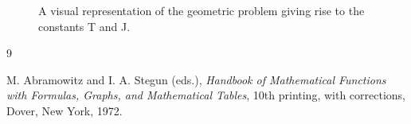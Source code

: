 \documentclass{amsart}
\theoremstyle{plain}
\theoremstyle{definition}
\theoremstyle{remark}
\begin{document}
\begin{figure}[htbp]
    \centering
    \caption{A visual representation of the geometric problem giving rise to the constants T and J.}
    \label{fig:geometry}
\end{figure}

\begin{thebibliography}{9}

M. Abramowitz and I. A. Stegun (eds.), \textit{Handbook of Mathematical Functions with Formulas, Graphs, and Mathematical Tables}, 10th printing, with corrections, Dover, New York, 1972.

\end{thebibliography}
\end{document}

